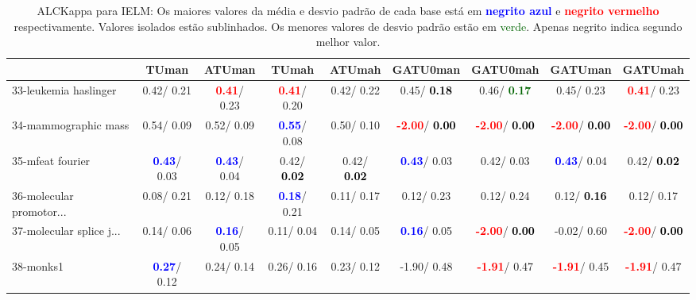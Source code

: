 \begin{table}[h]
\caption{ALCKappa para IELM: Os maiores valores da média e desvio padrão de cada base está em \textcolor{blue}{\textbf{negrito azul}} e \textcolor{red}{\textbf{negrito vermelho}} respectivamente. Valores isolados estão sublinhados. Os menores valores de desvio padrão estão em \textcolor{darkgreen}{verde}. Apenas negrito indica segundo melhor valor.}
\begin{center}\begin{tabular}{lc|c|c|c|c|c|c|c}
 & TUman & \textbf{ATUman} & TUmah & \textbf{ATUmah} & GATU0man & GATU0mah & GATUman & GATUmah\\ \hline 33-leukemia haslinger &   0.42/  0.21 & \textcolor{red}{\textbf{  0.41}}/  0.23 & \textcolor{red}{\textbf{  0.41}}/  0.20 &   0.42/  0.22 &   0.45/\textcolor{black}{\textbf{  0.18}} &   0.46/\textcolor{darkgreen}{\textbf{  0.17}} &   0.45/  0.23 & \textcolor{red}{\textbf{  0.41}}/  0.23 \\
34-mammographic mass &   0.54/  0.09 &   0.52/  0.09 & \textcolor{blue}{\textbf{  0.55}}/  0.08 &   0.50/  0.10 & \textcolor{red}{\textbf{ -2.00}}/\textcolor{black}{\textbf{  0.00}} & \textcolor{red}{\textbf{ -2.00}}/\textcolor{black}{\textbf{  0.00}} & \textcolor{red}{\textbf{ -2.00}}/\textcolor{black}{\textbf{  0.00}} & \textcolor{red}{\textbf{ -2.00}}/\textcolor{black}{\textbf{  0.00}} \\
35-mfeat fourier & \textcolor{blue}{\textbf{  0.43}}/  0.03 & \textcolor{blue}{\textbf{  0.43}}/  0.04 &   0.42/\textcolor{black}{\textbf{  0.02}} &   0.42/\textcolor{black}{\textbf{  0.02}} & \textcolor{blue}{\textbf{  0.43}}/  0.03 &   0.42/  0.03 & \textcolor{blue}{\textbf{  0.43}}/  0.04 &   0.42/\textcolor{black}{\textbf{  0.02}} \\
36-molecular promotor... &   0.08/  0.21 &   0.12/  0.18 & \textcolor{blue}{\textbf{  0.18}}/  0.21 &   0.11/  0.17 &   0.12/  0.23 &   0.12/  0.24 &   0.12/\textcolor{black}{\textbf{  0.16}} &   0.12/  0.17 \\
37-molecular splice j... &   0.14/  0.06 & \textcolor{blue}{\textbf{  0.16}}/  0.05 &   0.11/  0.04 &   0.14/  0.05 & \textcolor{blue}{\textbf{  0.16}}/  0.05 & \textcolor{red}{\textbf{ -2.00}}/\textcolor{black}{\textbf{  0.00}} &  -0.02/  0.60 & \textcolor{red}{\textbf{ -2.00}}/\textcolor{black}{\textbf{  0.00}} \\
38-monks1 & \textcolor{blue}{\textbf{  0.27}}/  0.12 &   0.24/  0.14 &   0.26/  0.16 &   0.23/  0.12 &  -1.90/  0.48 & \textcolor{red}{\textbf{ -1.91}}/  0.47 & \textcolor{red}{\textbf{ -1.91}}/  0.45 & \textcolor{red}{\textbf{ -1.91}}/  0.47 \\

\end{tabular}
\end{center}
\end{table}
